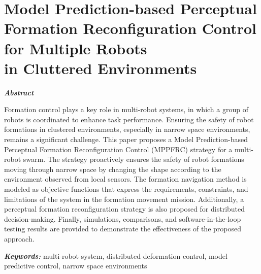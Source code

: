 \chapter{Model Prediction-based Perceptual Formation Reconfiguration Control for Multiple Robots\\in Cluttered Environments}\label{paper3}

\vspace{1cm}

\noindent\textit{\textbf{Abstract}}

Formation control plays a key role in multi-robot systems, in which a group of robots is coordinated to enhance task performance. Ensuring the safety of robot formations in clustered environments, especially in narrow space environments, remains a significant challenge. This paper proposes a Model Prediction-based Perceptual Formation Reconfiguration Control (MPPFRC) strategy for a multi-robot swarm. The strategy proactively ensures the safety of robot formations moving through narrow space by changing the shape according to the environment observed from local sensors. The formation navigation method is modeled as objective functions that express the requirements, constraints, and limitations of the system in the formation movement mission. Additionally, a perceptual formation reconfiguration strategy is also proposed for distributed decision-making. Finally, simulations, comparisons, and software-in-the-loop testing results are provided to demonstrate the effectiveness of the proposed approach.

\noindent\textbf{\textit{Keywords:}}
multi-robot system, distributed deformation control, model predictive control, narrow space environments







